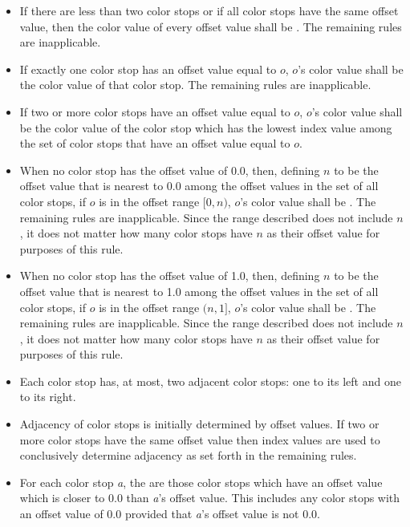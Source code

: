 \begin{itemize}
\item If there are less than two color stops or if all color stops have the same offset value, then the color value of every offset value shall be . The remaining rules are inapplicable.

\item If exactly one color stop has an offset value equal to $o$, $o$'s color value shall be the color value of that color stop. The remaining rules are inapplicable.

\item If two or more color stops have an offset value equal to $o$, $o$'s color value shall be the color value of the color stop which has the lowest index value among the set of color stops that have an offset value equal to $o$.

\item When no color stop has the offset value of 0.0, then, defining $n$ to be the offset value that is nearest to 0.0 among the offset values in the set of all color stops, if $o$ is in the offset range $[0, n)$, $o$'s color value shall be . The remaining rules are inapplicable.
\enternote
Since the range described does not include $n$, it does not matter how many color stops have $n$ as their offset value for purposes of this rule.
\exitnote

\item When no color stop has the offset value of 1.0, then, defining $n$ to be the offset value that is nearest to 1.0 among the offset values in the set of all color stops, if $o$ is in the offset range $(n, 1]$, $o$'s color value shall be . The remaining rules are inapplicable.
\enternote
Since the range described does not include $n$, it does not matter how many color stops have $n$ as their offset value for purposes of this rule.
\exitnote

\item Each color stop has, at most, two adjacent color stops: one to its left and one to its right.

\item Adjacency of color stops is initially determined by offset values. If two or more color stops have the same offset value then index values are used to conclusively determine adjacency as set forth in the remaining rules.

\item For each color stop \textit{a}, the  are those color stops which have an offset value which is closer to 0.0 than \textit{a}'s offset value.
\enternote
This includes any color stops with an offset value of 0.0 provided that \textit{a}'s offset value is not 0.0.
\exitnote


\end{itemize}

